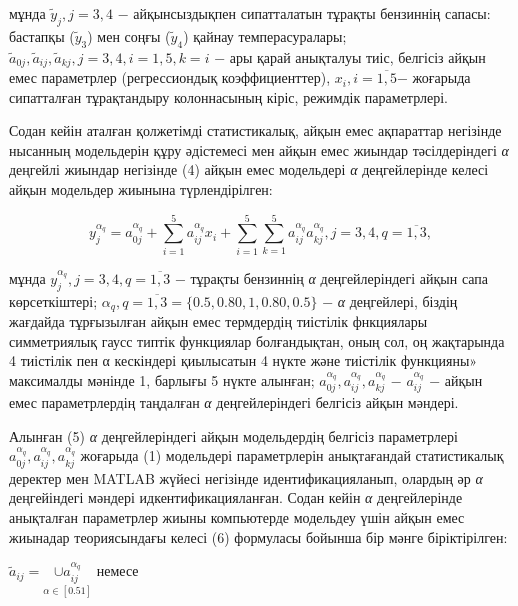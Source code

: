\begin{multicols}{2}
мұнда $\tilde{y}_j,j=3,4$ − айқынсыздықпен сипатталатын
тұрақты бензиннің сапасы: бастапқы ($\tilde{y}_3$)
мен соңғы ($\tilde{y}_4$) қайнау темперасуралары;
$\tilde{a}_{0j},\tilde{a}_{ij},\tilde{a}_{kj},j=3,4,i=1,5,k=i$
− ары қарай анықталуы тиіс, белгісіз
айқын емес параметрлер (регрессиондық коэффициенттер),
$x_i,i=\overline{1,5}$− жоғарыда сипатталған тұрақтандыру
колоннасының кіріс, режимдік параметрлері.

Содан кейін аталған қолжетімді статистикалық, айқын емес ақпараттар
негізінде нысанның модельдерін құру әдістемесі мен айқын емес жиындар
тәсілдеріндегі \emph{α} деңгейлі жиындар негізінде (4) айқын емес
модельдері \emph{α} деңгейлерінде келесі айқын модельдер жиынына
түрлендірілген:
\end{multicols}

\begin{equation}
y_j^{\alpha_q}=a_{0j}^{\alpha_q}+\sum_{i=1}^5a_{ij}^{\alpha_q}x_i+\sum_{i=1}^5\sum_{k=1}^5a_{ij}^{\alpha_q}a_{kj}^{\alpha_q},j=3,4,q=\overline{1,3},
\end{equation}

\begin{multicols}{2}
мұнда $y_j^{\alpha_q},j=3,4,q=\overline{1,3}$ − тұрақты
бензиннің \emph{α} деңгейлеріндегі айқын сапа көрсеткіштері;
$\alpha_q,q=\overline{1,3}=\{0.5,0.80,1,0.80,0.5\}$ − \emph{α}
деңгейлері, біздің жағдайда тұрғызылған айқын емес термдердің
тиістілік фнкциялары симметриялық гаусс типтік функциялар
болғандықтан, оның сол, оң жақтарында 4 тиістілік пен α кескіндері
қиылысатын 4 нүкте және тиістілік функцияны» максималды мәнінде 1,
барлығы 5 нүкте алынған;
$a_{0j}^{\alpha_q},a_{ij}^{\alpha_q},a_{kj}^{\alpha_q}$ −
$a_{ij}^{\alpha_q}$ − айқын емес параметрлердің таңдалған
\emph{α} деңгейлеріндегі белгісіз айқын мәндері.

Алынған (5) \emph{α} деңгейлеріндегі айқын модельдердің белгісіз
параметрлері $a_{0j}^{\alpha_q},a_{ij}^{\alpha_q},a_{kj}^{\alpha_q}$
жоғарыда (1) модельдері параметрлерін анықтағандай статистикалық
деректер мен MATLAB жүйесі негізінде идентификацияланып, олардың
әр \emph{α} деңгейіндегі мәндері идкентификацияланған. Содан
кейін \emph{α} деңгейлерінде анықталған параметрлер жиыны компьютерде
модельдеу үшін айқын емес жиынадар теориясындағы келесі (6) формуласы
бойынша бір мәнге біріктірілген:

$\tilde{a}_{ij}=\underset{\alpha \in [0.51]}{\cup a_{ij}^{\alpha_q}}$ немесе
\end{multicols}


